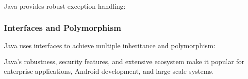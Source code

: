 Java provides robust exception handling:

\begin{Shaded}
\begin{Highlighting}[]
\NormalTok{ \{}
    \NormalTok{ / }\NormalTok{;}
\NormalTok{\} }\NormalTok{ (}
    \NormalTok{(}\NormalTok{);}
\NormalTok{\} }\NormalTok{ \{}
    \NormalTok{(}\NormalTok{);}
\NormalTok{\}}
\end{Highlighting}
\end{Shaded}

\hypertarget{interfaces-and-polymorphism}{%
\subsubsection{Interfaces and
Polymorphism}\label{interfaces-and-polymorphism}}

Java uses interfaces to achieve multiple inheritance and polymorphism:

\begin{Shaded}
\begin{Highlighting}[]
     \NormalTok{();}
\NormalTok{\}}

      \NormalTok{() \{}
        \NormalTok{(}\NormalTok{);}
\NormalTok{    \}}
\NormalTok{\}}

      \NormalTok{() \{}
        \NormalTok{(}\NormalTok{);}
\NormalTok{    \}}
\NormalTok{\}}
\end{Highlighting}
\end{Shaded}

Java's robustness, security features, and extensive ecosystem make it
popular for enterprise applications, Android development, and
large-scale systems.

